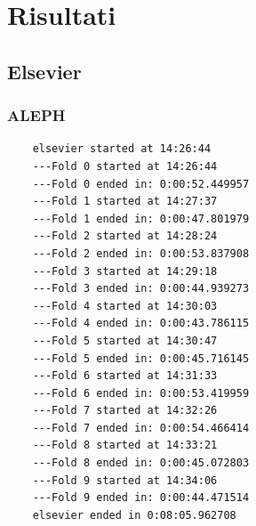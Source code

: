 \section{Risultati}
\subsection{Elsevier}
\subsubsection{ALEPH}

\begin{verbatim}
	elsevier started at 14:26:44
	---Fold 0 started at 14:26:44
	---Fold 0 ended in: 0:00:52.449957
	---Fold 1 started at 14:27:37
	---Fold 1 ended in: 0:00:47.801979
	---Fold 2 started at 14:28:24
	---Fold 2 ended in: 0:00:53.837908
	---Fold 3 started at 14:29:18
	---Fold 3 ended in: 0:00:44.939273
	---Fold 4 started at 14:30:03
	---Fold 4 ended in: 0:00:43.786115
	---Fold 5 started at 14:30:47
	---Fold 5 ended in: 0:00:45.716145
	---Fold 6 started at 14:31:33
	---Fold 6 ended in: 0:00:53.419959
	---Fold 7 started at 14:32:26
	---Fold 7 ended in: 0:00:54.466414
	---Fold 8 started at 14:33:21
	---Fold 8 ended in: 0:00:45.072803
	---Fold 9 started at 14:34:06
	---Fold 9 ended in: 0:00:44.471514
	elsevier ended in 0:08:05.962708
\end{verbatim}

